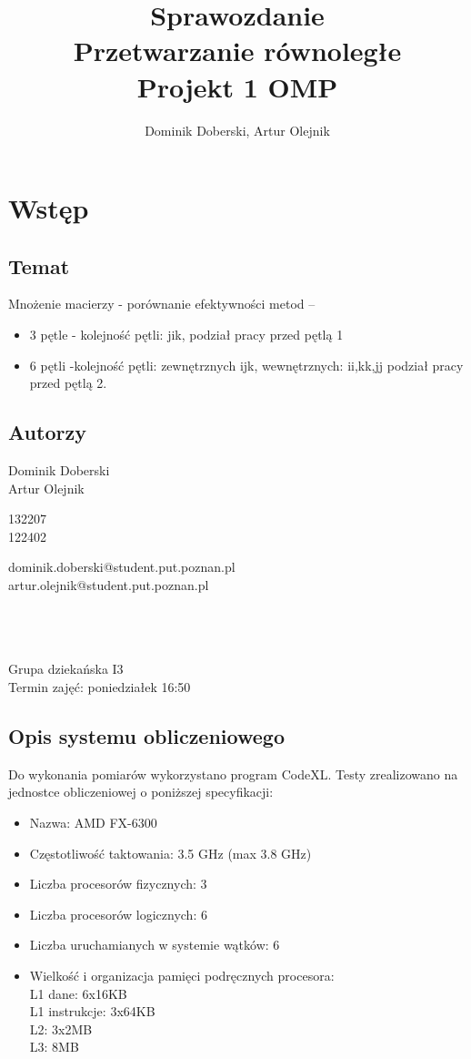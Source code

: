 \documentclass{article}
\author{Dominik Doberski, Artur Olejnik}
\title{
\huge Sprawozdanie 
\\Przetwarzanie równoległe\\
\Huge Projekt 1 OMP}
\begin{document}
\maketitle

\section{Wstęp}
\subsection{Temat}
Mnożenie macierzy - porównanie efektywności metod --
\begin{itemize}
\item 3 pętle - kolejność pętli: jik, podział pracy przed pętlą 1
\item 6 pętli -kolejność pętli: zewnętrznych ijk, wewnętrznych: ii,kk,jj podział pracy przed pętlą 2.
\end{itemize}
\subsection{Autorzy}
\begin{minipage}[t]{0.3\textwidth}
Dominik Doberski\\
Artur Olejnik
\end{minipage}
\begin{minipage}[t]{0.15\textwidth}
132207\\
122402
\end{minipage}
\begin{minipage}[t]{0.55\textwidth}
dominik.doberski@student.put.poznan.pl\\
artur.olejnik@student.put.poznan.pl
\end{minipage}
\\\\\\
Grupa dziekańska I3\\
Termin zajęć: poniedziałek 16:50 
\subsection{Opis systemu obliczeniowego}
Do wykonania pomiarów wykorzystano program CodeXL. Testy zrealizowano na jednostce obliczeniowej o poniższej specyfikacji:
\begin{itemize}
\item Nazwa: AMD FX-6300
\item Częstotliwość taktowania: 3.5 GHz (max 3.8 GHz)
\item Liczba procesorów fizycznych: 3
\item Liczba procesorów logicznych: 6
\item Liczba uruchamianych w systemie wątków: 6
\item Wielkość i organizacja pamięci podręcznych procesora:\\
L1 dane: 6x16KB\\
L1 instrukcje: 3x64KB\\
L2: 3x2MB\\
L3: 8MB\\
\end{itemize}
\end{document}
